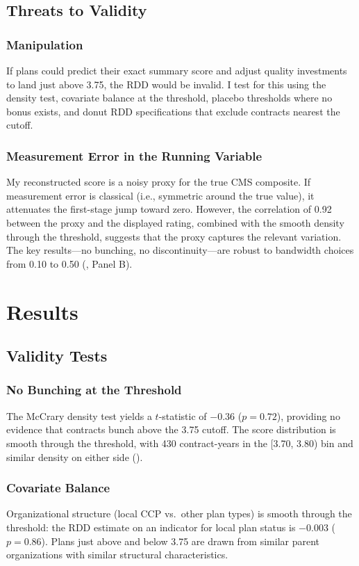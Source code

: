 \documentclass[12pt]{article}
\begin{document}
\subsection{Threats to Validity}

\subsubsection*{Manipulation} If plans could predict their exact summary score and adjust quality investments to land just above 3.75, the RDD would be invalid. I test for this using the \citet{mccrary2008} density test, covariate balance at the threshold, placebo thresholds where no bonus exists, and donut RDD specifications that exclude contracts nearest the cutoff.

\subsubsection*{Measurement Error in the Running Variable} My reconstructed score is a noisy proxy for the true CMS composite. If measurement error is classical (i.e., symmetric around the true value), it attenuates the first-stage jump toward zero. However, the correlation of 0.92 between the proxy and the displayed rating, combined with the smooth density through the threshold, suggests that the proxy captures the relevant variation. The key results---no bunching, no discontinuity---are robust to bandwidth choices from 0.10 to 0.50 (, Panel B).


\section{Results}
\label{sec:results}

\subsection{Validity Tests}

\subsubsection*{No Bunching at the Threshold} The McCrary density test yields a $t$-statistic of $-0.36$ ($p = 0.72$), providing no evidence that contracts bunch above the 3.75 cutoff. The score distribution is smooth through the threshold, with 430 contract-years in the [3.70, 3.80) bin and similar density on either side ().

\subsubsection*{Covariate Balance} Organizational structure (local CCP vs.\ other plan types) is smooth through the threshold: the RDD estimate on an indicator for local plan status is $-0.003$ ($p = 0.86$). Plans just above and below 3.75 are drawn from similar parent organizations with similar structural characteristics.
\end{document}
